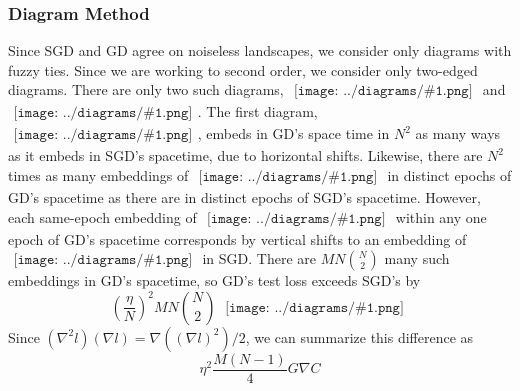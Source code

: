 \documentclass{article}
\theoremstyle{plain}
\theoremstyle{definition}
\newcommand{\wrap}[1]{\left(#1\right)}
\newcommand{\sdia}[1]{\begin{gathered}\texttt{[image: ../diagrams/\#1.png]}\end{gathered}}
\begin{document}
        \subsubsection*{Diagram Method}
            Since SGD and GD agree on noiseless landscapes, we consider only
            diagrams with fuzzy ties.  Since we are working to second order, we
            consider only two-edged diagrams.  There are only two such
            diagrams, $\sdia{(01-2)(02-12)}$ and $\sdia{(01-2)(01-12)}$.  The
            first diagram, $\sdia{(01-2)(02-12)}$, embeds in GD's space time in
            $N^2$ as many ways as it embeds in SGD's spacetime, due to
            horizontal shifts.  Likewise, there are $N^2$ times as many
            embeddings of $\sdia{(01-2)(02-12)}$ in distinct epochs of GD's
            spacetime as there are in distinct epochs of SGD's spacetime.
            However, each same-epoch embedding of $\sdia{(01-2)(01-12)}$ within
            any one epoch of GD's spacetime corresponds by vertical shifts to
            an embedding of $\sdia{(0-1-2)(01-12)}$ in SGD.  There are
            $MN{N\choose 2}$ many such embeddings in GD's spacetime, so GD's
            test loss exceeds SGD's by 
            $$
                \wrap{\frac{\eta}{N}}^2 MN{N\choose 2}~
                \sdia{c(01-2)(01-12)}
            $$
            Since $(\nabla^2 l) (\nabla l) = \nabla((\nabla l)^2)/2$, we can 
            summarize this difference as
            $$
                \eta^2 \frac{M(N-1)}{4} G \nabla C 
            $$
\end{document}
